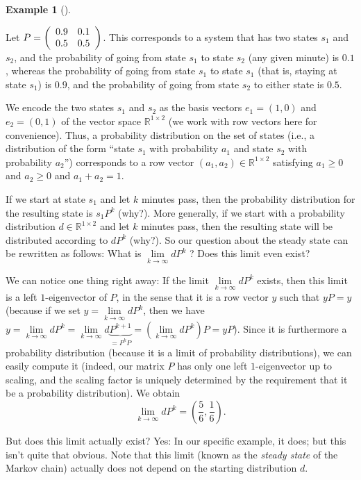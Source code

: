 \documentclass[numbers=enddot,12pt,final,onecolumn,notitlepage]{scrartcl}%
\numberwithin{exer}{subsection}
\theoremstyle{definition}
\newtheorem{exam}[theo]{Example}
\newenvironment{example}[1][]
{\begin{exam}[#1]\begin{leftbar}}
{\end{leftbar}\end{exam}}
\begin{document}
\begin{example}
\label{exa.posmat.markov-chain.1}Let $P=\left(
\begin{array}
[c]{cc}%
0.9 & 0.1\\
0.5 & 0.5
\end{array}
\right)  $. This corresponds to a system that has two states $s_{1}$ and
$s_{2}$, and the probability of going from state $s_{1}$ to state $s_{2}$ (any
given minute) is $0.1$, whereas the probability of going from state $s_{1}$ to
state $s_{1}$ (that is, staying at state $s_{1}$) is $0.9$, and the
probability of going from state $s_{2}$ to either state is $0.5$.

We encode the two states $s_{1}$ and $s_{2}$ as the basis vectors
$e_{1}=\left(  1,0\right)  $ and $e_{2}=\left(  0,1\right)  $ of the vector
space $\mathbb{R}^{1\times2}$ (we work with row vectors here for convenience).
Thus, a probability distribution on the set of states (i.e., a distribution of
the form \textquotedblleft state $s_{1}$ with probability $a_{1}$ and state
$s_{2}$ with probability $a_{2}$\textquotedblright) corresponds to a row
vector $\left(  a_{1},a_{2}\right)  \in\mathbb{R}^{1\times2}$ satisfying
$a_{1}\geq0$ and $a_{2}\geq0$ and $a_{1}+a_{2}=1$.

If we start at state $s_{1}$ and let $k$ minutes pass, then the probability
distribution for the resulting state is $s_{1}P^{k}$ (why?). More generally,
if we start with a probability distribution $d\in\mathbb{R}^{1\times2}$ and
let $k$ minutes pass, then the resulting state will be distributed according
to $dP^{k}$ (why?). So our question about the steady state can be rewritten as
follows: What is $\lim\limits_{k\rightarrow\infty}dP^{k}$ ? Does this limit
even exist?

We can notice one thing right away: If the limit $\lim\limits_{k\rightarrow
\infty}dP^{k}$ exists, then this limit is a left $1$-eigenvector of $P$, in
the sense that it is a row vector $y$ such that $yP=y$ (because if we set
$y=\lim\limits_{k\rightarrow\infty}dP^{k}$, then we have $y=\lim
\limits_{k\rightarrow\infty}dP^{k}=\lim\limits_{k\rightarrow\infty
}d\underbrace{P^{k+1}}_{=P^{k}P}=\left(  \lim\limits_{k\rightarrow\infty
}dP^{k}\right)  P=yP$). Since it is furthermore a probability distribution
(because it is a limit of probability distributions), we can easily compute it
(indeed, our matrix $P$ has only one left $1$-eigenvector up to scaling, and
the scaling factor is uniquely determined by the requirement that it be a
probability distribution). We obtain%
\[
\lim\limits_{k\rightarrow\infty}dP^{k}=\left(  \dfrac{5}{6},\dfrac{1}%
{6}\right)  .
\]


But does this limit actually exist? Yes: In our specific example, it does; but
this isn't quite that obvious. Note that this limit (known as the \emph{steady
state} of the Markov chain) actually does not depend on the starting
distribution $d$.
\end{example}
\end{document}
